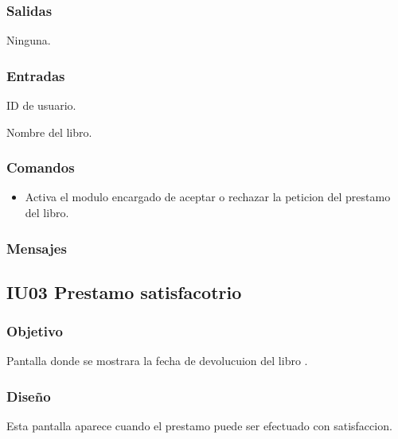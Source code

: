 
\subsubsection{Salidas}
	\begin{Citemize}
		\item Ninguna. 
	\end{Citemize}
	
\subsubsection{Entradas}
	\begin{Citemize}
		\item ID de usuario.
		\item Nombre del libro.
	\end{Citemize}

\subsubsection{Comandos}
\begin{itemize}
	\item  {} Activa el modulo encargado de aceptar o rechazar la peticion del prestamo del libro.
\end{itemize}

\subsubsection{Mensajes}
	\begin{Citemize}
		\item {\bf  {} }
	\end{Citemize}

\newpage
\subsection{IU03 Prestamo satisfacotrio}

\subsubsection{Objetivo}
	Pantalla donde se mostrara la fecha de devolucuion del libro .

\subsubsection{Diseño}
	Esta pantalla aparece cuando el prestamo puede ser efectuado con satisfaccion.

